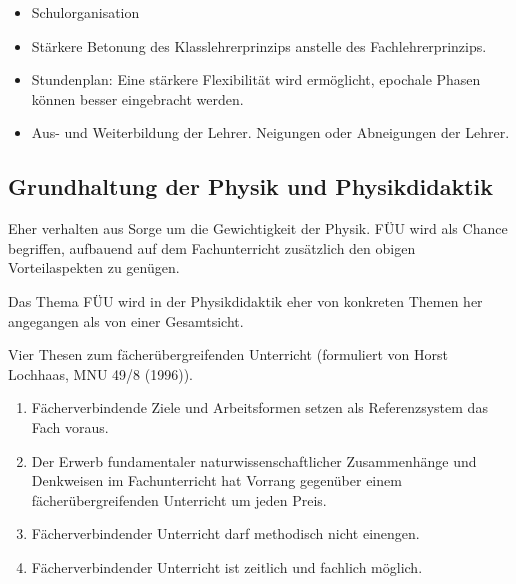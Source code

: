 \begin{itemize}
\setlength{\itemsep}{0mm}
\item Schulorganisation
\item
St\"{a}rkere Betonung des Klasslehrerprinzips anstelle
des Fachlehrerprinzips.
\item Stundenplan:
Eine st\"{a}rkere Flexibilit\"{a}t wird erm\"{o}glicht, epochale Phasen
k\"{o}nnen besser eingebracht werden.
\item
Aus- und Weiterbildung der Lehrer.
Neigungen oder Abneigungen der Lehrer.
\end{itemize}

\subsection{Grundhaltung der Physik und Physikdidaktik}

Eher verhalten aus Sorge um die Gewichtigkeit der Physik.
F\"{U}U wird als Chance begriffen, aufbauend auf dem
Fachunterricht zus\"{a}tzlich den obigen Vorteilaspekten zu gen\"{u}gen.

Das Thema F\"{U}U wird in der Physikdidaktik eher von konkreten
Themen her angegangen als von einer Gesamtsicht.

\bip
Vier Thesen zum f\"{a}cher\"{u}bergreifenden Unterricht
(formuliert von Horst Lochhaas, MNU 49/8 (1996)).
\begin{enumerate}
\item
F\"{a}cherverbindende Ziele und Arbeitsformen setzen als
Referenzsystem das Fach voraus.
\item
Der Erwerb fundamentaler naturwissenschaftlicher
Zusammenh\"{a}nge und Denkweisen im Fachunterricht hat Vorrang
gegen\"{u}ber einem f\"{a}cher\"{u}bergreifenden Unterricht um jeden Preis.
\item
F\"{a}cherverbindender Unterricht darf methodisch nicht einengen.
\item
F\"{a}cherverbindender Unterricht ist zeitlich und fachlich m\"{o}glich.
\end{enumerate}


